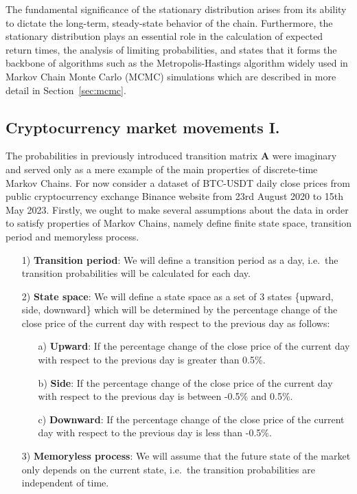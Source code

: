 The fundamental significance of the stationary distribution arises from its ability to dictate the long-term, 
steady-state behavior of the chain. Furthermore, the stationary distribution plays an essential role in the 
calculation of expected return times, the analysis of limiting probabilities, and \citep{Navarro2011} states that it forms the backbone of
algorithms such as the Metropolis-Hastings algorithm widely used in Markov Chain Monte Carlo (MCMC) simulations which are described
in more detail in Section~\ref{sec:mcmc}.

\subsection{Cryptocurrency market movements I.}

The probabilities in previously introduced transition matrix $\textbf{A}$ were imaginary and served only as a mere example of the main properties of discrete-time Markov Chains. 
For now consider a dataset of BTC-USDT daily close prices from public cryptocurrency exchange Binance website from 23rd August 2020 to 15th May 2023. 
Firstly, we ought to make several assumptions about the data in order to satisfy properties of Markov Chains, namely define finite state space, transition period and memoryless process. 

\begin{itemize}
\item [1)] \textbf{Transition period}: We will define a transition period as a day, i.e.\ the transition probabilities will be calculated for each day.
\item [2)] \textbf{State space}: We will define a state space as a set of 3 states \{upward, side, downward\} which will be determined by the percentage change of the close price of the current day with respect to the previous day as follows:
    \begin{itemize}
    \item [a)] \textbf{Upward}: If the percentage change of the close price of the current day with respect to the previous day is greater than 0.5\%.
    \item [b)] \textbf{Side}: If the percentage change of the close price of the current day with respect to the previous day is between -0.5\% and 0.5\%.
    \item [c)] \textbf{Downward}: If the percentage change of the close price of the current day with respect to the previous day is less than -0.5\%.
    \end{itemize}
\item [3)] \textbf{Memoryless process}: We will assume that the future state of the market only depends on the current state, i.e.\ the transition probabilities are independent of time.
\end{itemize}

